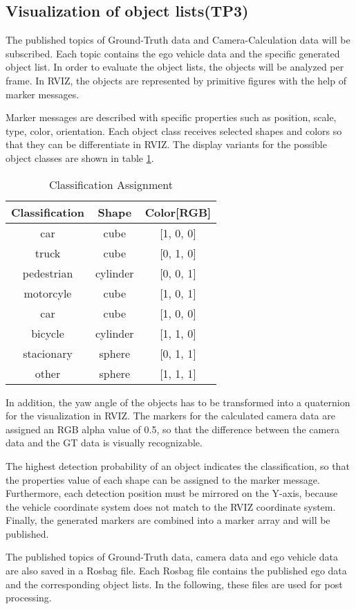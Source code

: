 \subsection{Visualization of object lists(TP3)}

The published topics of Ground-Truth data and Camera-Calculation data will be subscribed. Each topic contains the ego vehicle data and the specific generated object list. In order to evaluate the object lists, the objects will be analyzed per frame. In RVIZ, the objects are represented by primitive figures with the help of marker messages.



Marker messages are described with specific properties such as position, scale, type, color, orientation. Each object class receives selected shapes and colors so that they can be differentiate in RVIZ. The display variants for the possible object classes are shown in table \ref{ClassificationAssignment}. 

\begin{table}[h]
\caption{Classification Assignment}
\label{ClassificationAssignment}
\begin{center}
\begin{tabular}{c c c}
\hline
Classification & Shape & Color[RGB]\\
\hline
car & cube & [1, 0, 0]\\
truck & cube & [0, 1, 0]\\
pedestrian & cylinder & [0, 0, 1]\\
motorcyle & cube & [1, 0, 1]\\
car & cube & [1, 0, 0]\\
bicycle & cylinder & [1, 1, 0]\\
stacionary & sphere & [0, 1, 1]\\
other & sphere & [1, 1, 1]\\
\hline


\end{tabular}
\end{center}
\end{table}

In addition, the yaw angle of the objects has to be transformed into a quaternion for the visualization in RVIZ. The markers for the calculated camera data are assigned an RGB alpha value of 0.5, so that the difference between the camera data and the GT data is visually recognizable. 




The highest detection probability of an object indicates the classification, so that the properties value of each shape can be assigned to the marker message. Furthermore, each detection position must be mirrored on the Y-axis, because the vehicle coordinate system does not match to the RVIZ coordinate system. Finally, the generated markers are combined into a marker array and will be published.

The published topics of Ground-Truth data, camera data and ego vehicle data are also saved in a Rosbag file. Each Rosbag file contains the published ego data and the corresponding object lists. In the following, these files are used for post processing.
